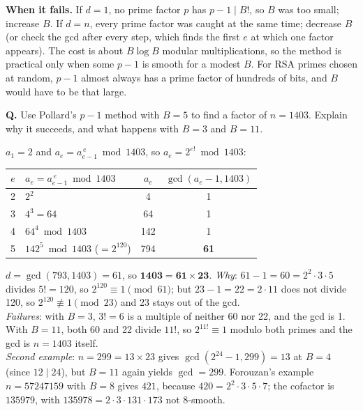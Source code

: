 \textbf{When it fails.} If $d = 1$, no prime factor $p$ has $p - 1 \mid B!$, so $B$ was too small; increase $B$. If $d = n$, every prime factor was caught at the same time; decrease $B$ (or check the gcd after every step, which finds the first $e$ at which one factor appears). The cost is about $B \log B$ modular multiplications, so the method is practical only when some $p - 1$ is smooth for a modest $B$. For RSA primes chosen at random, $p - 1$ almost always has a prime factor of hundreds of bits, and $B$ would have to be that large.

\begin{worked}[: Pollard $p - 1$ on $n = 1403$ with $B = 5$]
\textbf{Q.} Use Pollard's $p - 1$ method with $B = 5$ to find a factor of $n = 1403$. Explain why it succeeds, and what happens with $B = 3$ and $B = 11$.

$a_1 = 2$ and $a_e = a_{e-1}^{\,e} \bmod 1403$, so $a_e = 2^{e!} \bmod 1403$:
\begin{center}\small
\begin{tabular}{@{}clcc@{}}
\toprule
$e$ & $a_e = a_{e-1}^{\,e} \bmod 1403$ & $a_e$ & $\gcd(a_e - 1, 1403)$\\
\midrule
2 & $2^2$ & 4 & 1\\
3 & $4^3 = 64$ & 64 & 1\\
4 & $64^4 \bmod 1403$ & 142 & 1\\
5 & $142^5 \bmod 1403$ ($= 2^{120}$) & 794 & \textbf{61}\\
\bottomrule
\end{tabular}
\end{center}
$d = \gcd(793, 1403) = 61$, so $\mathbf{1403 = 61 \times 23}$. \emph{Why}: $61 - 1 = 60 = 2^2 \cdot 3 \cdot 5$ divides $5! = 120$, so $2^{120} \equiv 1 \pmod{61}$; but $23 - 1 = 22 = 2 \cdot 11$ does not divide 120, so $2^{120} \not\equiv 1 \pmod{23}$ and 23 stays out of the gcd.\\
\emph{Failures}: with $B = 3$, $3! = 6$ is a multiple of neither 60 nor 22, and the gcd is 1. With $B = 11$, both 60 and 22 divide $11!$, so $2^{11!} \equiv 1$ modulo both primes and the gcd is $n = 1403$ itself.\\
\emph{Second example}: $n = 299 = 13 \times 23$ gives $\gcd(2^{24} - 1, 299) = 13$ at $B = 4$ (since $12 \mid 24$), but $B = 11$ again yields $\gcd = 299$. Forouzan's example $n = 57247159$ with $B = 8$ gives $421$, because $420 = 2^2 \cdot 3 \cdot 5 \cdot 7$; the cofactor is $135979$, with $135978 = 2 \cdot 3 \cdot 131 \cdot 173$ not 8-smooth.
\end{worked}

